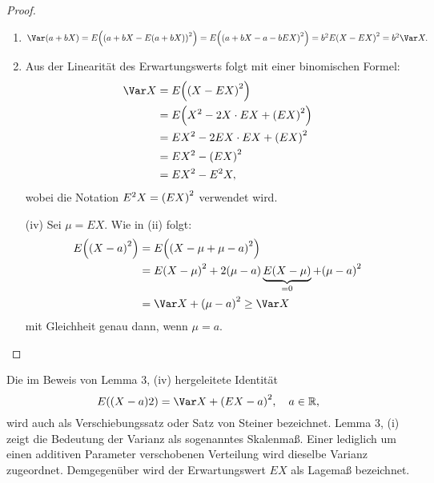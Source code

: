\documentclass{lecture}
\begin{document}
    \begin{proof}
        \begin{enumerate}
            \item \(\Var\parentheses*{a + bX} = E\parentheses*{\parentheses*{a + bX - E\parentheses*{a + bX}}^2} = E\parentheses*{\parentheses*{a + bX - a - bEX}^2} = b^2 E\parentheses*{X - EX}^2 = b^2 \Var X.\)
            \item Aus der Linearität des Erwartungswerts folgt mit einer binomischen Formel:
            \begin{align*}
                \Var X &= E\parentheses*{\parentheses*{X - EX}^2}\\
                &= E\parentheses*{X^2 - 2X \cdot EX + \parentheses*{EX}^2}\\
                &= EX^2 - 2EX \cdot EX + \parentheses*{EX}^2\\
                &= EX^2 - \parentheses*{EX}^2\\
                &= EX^2 - E^2 X,
            \end{align*}
            wobei die Notation \(E^2 X = \parentheses*{EX}^2\) verwendet wird.
            \item[(iv)] Sei \(\mu = EX\).
            Wie in (ii) folgt:
            \begin{align*}
                E\parentheses*{\parentheses*{X - a}^2} &= E\parentheses*{\parentheses*{X - \mu + \mu - a}^2}\\
                &= E\parentheses*{X - \mu}^2 + 2\parentheses*{\mu - a}\underbrace{E\parentheses*{X - \mu}}_{= 0} + \parentheses*{\mu - a}^2\\
                &= \Var X + \parentheses*{\mu - a}^2 \ge \Var X
            \end{align*}
            mit Gleichheit genau dann, wenn \(\mu = a\).
        \end{enumerate}
    \end{proof}
    
    Die im Beweis von Lemma 3, (iv) hergeleitete Identität
    \[
        E\parentheses*{\parentheses*{X - a} 2} = \Var X + \parentheses*{EX - a}^2, \quad a \in \R,
    \]
    wird auch als Verschiebungssatz oder Satz von Steiner bezeichnet.
    Lemma 3, (i) zeigt die Bedeutung der Varianz als sogenanntes Skalenmaß.
    Einer lediglich um einen additiven Parameter verschobenen Verteilung wird dieselbe Varianz zugeordnet.
    Demgegenüber wird der Erwartungswert \(EX\) als Lagemaß bezeichnet.
    
\end{document}
